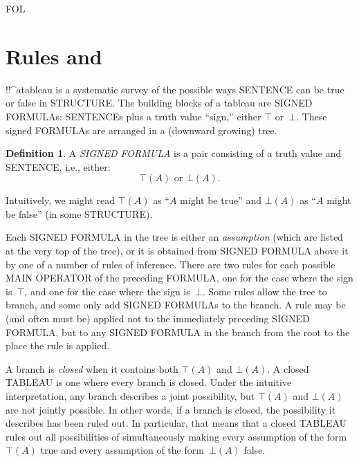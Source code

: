 \documentclass[10pt,a4paper]{article}
\newcommand*{\olup}[1]{\MakeUppercase{#1}}
\theoremstyle{plain}
\theoremstyle{definition}
\newtheorem{defn}[thm]{Definition}
\theoremstyle{remark}
\newcommand*{\olfileid}[3]{}
\newcommand*{\olsection}[1]{\section*{#1}}
\providecommand{\sFmla}[2]{#1(#2)}
\providecommand{\True}{\top}
\providecommand{\False}{\bot}
\providecommand{\iftag}[1]{#1}
\providecommand{\iftag}{}
\begin{document}



\iftag{FOL}
      {\olfileid{fol}{tab}{rul}}
      {\olfileid{pl}{tab}{rul}}

\olsection{Rules and }

!!^a{tableau} is a systematic survey of the possible ways
\olup{sentence} can be true or false in \olup{structure}. The building
blocks of a tableau are \olup{signed formula}s: \olup{sentence}s plus a
truth value ``sign,'' either $\True$ or~$\False$. These signed
\olup{formula}s are arranged in a (downward growing) tree.

\begin{defn}
  A \emph{\olup{signed formula}} is a pair consisting of a truth value
  and \olup{sentence}, i.e., either:
  \[
  \sFmla{\True}{A} \text{ or } \sFmla{\False}{A}.
  \]
\end{defn}

Intuitively, we might read $\sFmla{\True}{A}$ as ``$A$ might be
true'' and $\sFmla{\False}{A}$ as ``$A$ might be false'' (in some
\olup{structure}).

Each \olup{signed formula} in the tree is either an \emph{assumption}
(which are listed at the very top of the tree), or it is obtained from
\olup{signed formula} above it by one of a number of rules of
inference. There are two rules for each possible \olup{main operator} of
the preceding \olup{formula}, one for the case where the sign is~$\True$,
and one for the case where the sign is~$\False$. Some rules allow the
tree to branch, and some only add \olup{signed formula}s to the branch.
A rule may be (and often must be) applied not to the immediately
preceding \olup{signed formula}, but to any \olup{signed formula} in the
branch from the root to the place the rule is applied.

A branch is \emph{closed} when it contains both $\sFmla{\True}{A}$
and $\sFmla{\False}{A}$. A closed \olup{tableau} is one where every branch
is closed.  Under the intuitive interpretation, any branch describes a
joint possibility, but $\sFmla{\True}{A}$ and $\sFmla{\False}{A}$
are not jointly possible. In other words, if a branch is closed, the
possibility it describes has been ruled out. In particular, that means
that a closed \olup{tableau} rules out all possibilities of simultaneously
making every assumption of the form $\sFmla{\True}{A}$ true and every
assumption of the form~$\sFmla{\False}{A}$ false.
\end{document}
